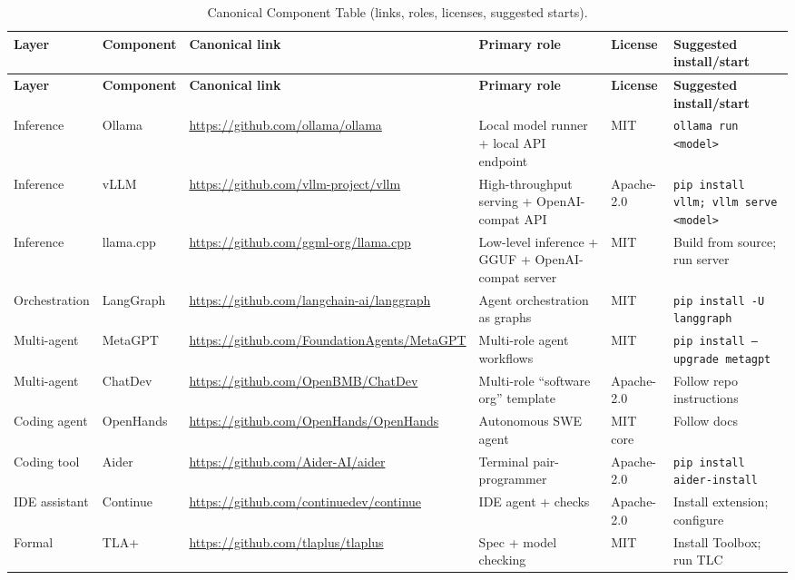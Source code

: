 \documentclass[11pt]{article}
\begin{document}
\begin{longtable}{@{}p{}p{}p{}p{}p{}p{}@{}}
\caption{Canonical Component Table (links, roles, licenses, suggested starts).}\label{tab:components}\\
\toprule
\textbf{Layer} & \textbf{Component} & \textbf{Canonical link} & \textbf{Primary role} & \textbf{License} & \textbf{Suggested install/start}\\
\midrule
\endfirsthead
\toprule
\textbf{Layer} & \textbf{Component} & \textbf{Canonical link} & \textbf{Primary role} & \textbf{License} & \textbf{Suggested install/start}\\
\midrule
\endhead

Inference & Ollama & \url{https://github.com/ollama/ollama} & Local model runner + local API endpoint & MIT & \texttt{ollama run <model>}\\
Inference & vLLM & \url{https://github.com/vllm-project/vllm} & High-throughput serving + OpenAI-compat API & Apache-2.0 & \texttt{pip install vllm; vllm serve <model>}\\
Inference & llama.cpp & \url{https://github.com/ggml-org/llama.cpp} & Low-level inference + GGUF + OpenAI-compat server & MIT & Build from source; run server\\
Orchestration & LangGraph & \url{https://github.com/langchain-ai/langgraph} & Agent orchestration as graphs & MIT & \texttt{pip install -U langgraph}\\
Multi-agent & MetaGPT & \url{https://github.com/FoundationAgents/MetaGPT} & Multi-role agent workflows & MIT & \texttt{pip install --upgrade metagpt}\\
Multi-agent & ChatDev & \url{https://github.com/OpenBMB/ChatDev} & Multi-role ``software org'' template & Apache-2.0 & Follow repo instructions\\
Coding agent & OpenHands & \url{https://github.com/OpenHands/OpenHands} & Autonomous SWE agent & MIT core & Follow docs\\
Coding tool & Aider & \url{https://github.com/Aider-AI/aider} & Terminal pair-programmer & Apache-2.0 & \texttt{pip install aider-install}\\
IDE assistant & Continue & \url{https://github.com/continuedev/continue} & IDE agent + checks & Apache-2.0 & Install extension; configure\\
Formal & TLA+ & \url{https://github.com/tlaplus/tlaplus} & Spec + model checking & MIT & Install Toolbox; run TLC\\

\end{longtable}
\end{document}
